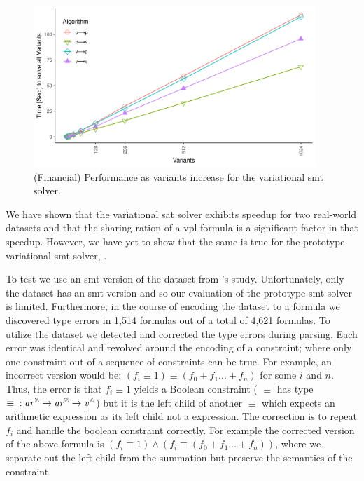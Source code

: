 \label{section:case-studies:vsmt}
%
\begin{figure}[h]
  \includegraphics[width=0.95\textwidth]{Plots/RQ1_Fin_Smt}
  \caption{(Financial) Performance as variants increase for the variational
    \ac{smt} solver.}%
  \label{res:rq1:vsmt}
\end{figure}
%
We have shown that the variational \ac{sat} solver exhibits speedup for two
real-world datasets and that the sharing ration of a \ac{vpl} formula is a
significant factor in that speedup. However, we have yet to show that the same
is true for the prototype variational \ac{smt} solver, \vsmt{}.

To test \vsmt{} we use an \ac{smt} version of the \fin{} dataset from \nieke{}'s
study. Unfortunately, only the \fin{} dataset has an \ac{smt} version and so our
evaluation of the prototype \ac{smt} solver is limited. Furthermore, in the
course of encoding the dataset to a \evpl{} formula we discovered type errors in
1,514 formulas out of a total of 4,621 formulas. To utilize the dataset we
detected and corrected the type errors during parsing. Each error was identical
and revolved around the encoding of a  constraint; where only one
constraint out of a sequence of constraints can be true. For example, an
incorrect version would be: $(f_{i} \equiv{} 1) \equiv{} (f_{0} + f_{1} \ldots{}
+ f_{n})$ for some $i$ and $n$. Thus, the error is that $f_{i} \equiv 1$ yields
a Boolean constraint (\ie{} $\equiv$ has type $\equiv{} : \mathit{ar^{\mathbb{Z}}}{} \rightarrow
\mathit{ar^{\mathbb{Z}}}{} \rightarrow{} \mathit{v^{\mathbb{Z}}}{}$) but it is the left child of another $\equiv$ which
expects an arithmetic expression as its left child not a \eIL{} expression. The
correction is to repeat $f_{i}$ and handle the boolean constraint correctly. For
example the corrected version of the above formula is $(f_{i} \equiv{} 1)
\wedge{} (f_{i} \equiv{} (f_{0} + f_{1} \ldots{} + f_{n}))$, where we separate
out the left child from the summation but preserve the semantics of the
 constraint.

